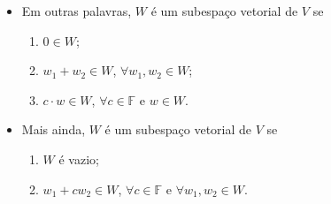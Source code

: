 \begin{itemize}
	\item

	      Em outras palavras, $W$ é um subespaço vetorial de $V$ se

	      \begin{enumerate}
		      \item

		            $0\in W$;

		      \item

		            $w_{1}+w_{2}\in W$, $\forall w_{1},w_{2}\in W$;

		      \item

		            $c\cdot w\in W$, $\forall c\in\mathbb{F}$ e $w\in W$.
	      \end{enumerate}
	\item

	      Mais ainda, $W$ é um subespaço vetorial de $V$ se
	      \begin{enumerate}
		      \item

		            $W$ é  vazio;

		      \item

		            $w_{1}+cw_{2}\in W$, $\forall c\in\mathbb{F}$ e $\forall w_{1},w_{2}\in W$.
	      \end{enumerate}
\end{itemize}

